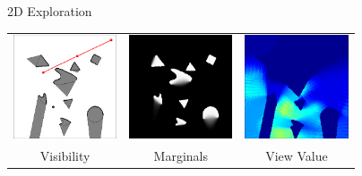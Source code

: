 \addtocounter{framenumber}{-1}
\begin{tframe}{2D Exploration}
\begin{center}

\bigskip
\begin{tabular}{ccc}
\includegraphics[width=1.2in]{media_exploration/2D_scene_03}&
\includegraphics[width=1.2in]{media_exploration/2D_marginal_03}&
\includegraphics[width=1.2in]{media_exploration/2D_energy_03}
\\ Visibility & Marginals & View Value
\end{tabular}
\end{center}
\end{tframe}

